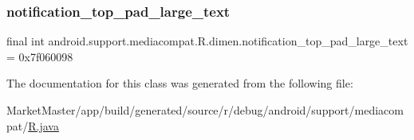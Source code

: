 \subsubsection{\texorpdfstring{notification\+\_\+top\+\_\+pad\+\_\+large\+\_\+text}{notification\_top\_pad\_large\_text}}
{\footnotesize\ttfamily final int android.\+support.\+mediacompat.\+R.\+dimen.\+notification\+\_\+top\+\_\+pad\+\_\+large\+\_\+text = 0x7f060098\hspace{0.3cm}{\ttfamily [static]}}



The documentation for this class was generated from the following file\+:\begin{DoxyCompactItemize}
\item 
Market\+Master/app/build/generated/source/r/debug/android/support/mediacompat/\mbox{\hyperlink{debug_2android_2support_2mediacompat_2R_8java}{R.\+java}}\end{DoxyCompactItemize}
